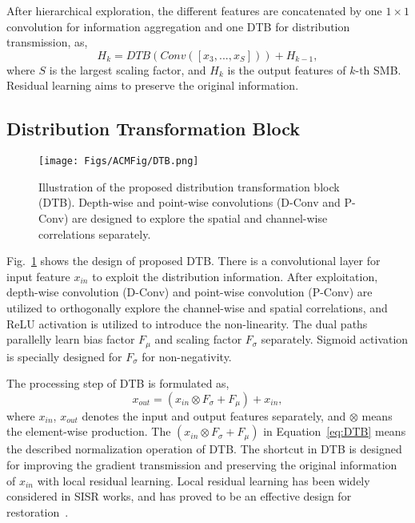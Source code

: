 \documentclass[manuscript,screen]{acmart}
\begin{document}
After hierarchical exploration, the different features are concatenated by one $1\times1$ convolution for information aggregation and one DTB for distribution transmission, as,
\begin{equation}
	H_k = DTB(Conv([x_3, ..., x_S])) + H_{k-1},
\end{equation}
where $S$ is the largest scaling factor, and $H_k$ is the output features of $k$-th SMB. Residual learning aims to preserve the original information.

\subsection{Distribution Transformation Block}
\begin{figure}[t]
	\centering
	\texttt{[image: Figs/ACMFig/DTB.png]}
	\caption{Illustration of the proposed distribution transformation block (DTB). Depth-wise and point-wise convolutions (D-Conv and P-Conv) are designed to explore the spatial and channel-wise correlations separately.}
	\label{fig:DTB}
\end{figure}

Fig.~\ref{fig:DTB} shows the design of proposed DTB. There is a convolutional layer for input feature $x_{in}$ to exploit the distribution information. After exploitation, depth-wise convolution (D-Conv) and point-wise convolution (P-Conv) are utilized to orthogonally explore the channel-wise and spatial correlations, and ReLU activation is utilized to introduce the non-linearity. The dual paths parallelly learn bias factor $F_\mu$ and scaling factor $F_\sigma$ separately. Sigmoid activation is specially designed for $F_\sigma$ for non-negativity.

The processing step of DTB is formulated as,
\begin{equation}
	x_{out} = (x_{in} \otimes F_\sigma + F_\mu) + x_{in},
	\label{eq:DTB}
\end{equation}
where $x_{in}$, $x_{out}$ denotes the input and output features separately, and $\otimes$ means the element-wise production. The $(x_{in} \otimes F_\sigma + F_\mu)$ in Equation~\ref{eq:DTB} means the described normalization operation of DTB. The shortcut in DTB is designed for improving the gradient transmission and preserving the original information of $x_{in}$ with local residual learning. Local residual learning has been widely considered in SISR works, and has proved to be an effective design for restoration~\cite{edsr_cvpr2017, rcan_eccv2018, rdn_pami2020, rfanet_cvpr2020}.
\end{document}
